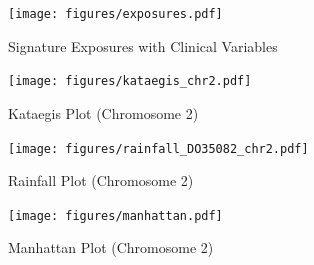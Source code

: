 \documentclass[12pt, letterpaper]{article}
\begin{document}
\begin{figure}[h!]
    \caption{Signature Exposures with Clinical Variables}
    \centering
    \texttt{[image: figures/exposures.pdf]}
\end{figure}
\begin{figure}[h!]
    \caption{Kataegis Plot (Chromosome 2)}
    \centering
    \texttt{[image: figures/kataegis\_chr2.pdf]}
\end{figure}
\begin{figure}[h!]
    \caption{Rainfall Plot (Chromosome 2)}
    \centering
    \texttt{[image: figures/rainfall\_DO35082\_chr2.pdf]}
\end{figure}
\begin{figure}[h!]
    \caption{Manhattan Plot (Chromosome 2)}
    \centering
    \texttt{[image: figures/manhattan.pdf]}
\end{figure}
\end{document}
